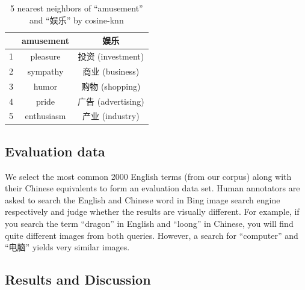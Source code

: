 \begin{table}
\small
\centering
\begin{tabular}{|c|c|c|}
\hline
 & \bf{amusement} & \bf{娱乐} \\ \hline
\hline
1 & pleasure & 投资 (investment) \\
\hline
2 & sympathy & 商业 (business)\\
\hline
3 &  humor & 购物 (shopping)\\
\hline
4 &  pride &  广告 (advertising)\\
\hline
5 &  enthusiasm &  产业 (industry)\\

\hline
\end{tabular}
\caption{5 nearest neighbors of ``amusement'' and ``娱乐'' by cosine-knn}
\label{tab:nn}
\end{table}

\subsection{Evaluation data}

We select the most common 2000 English terms (from our corpus)
along with their Chinese equivalents to form an evaluation data set. 
Human annotators are 
asked to search the English and Chinese word in Bing image 
search engine respectively and judge whether the results are visually
different.  For example, if you search the term ``dragon'' in English 
and ``loong'' in Chinese, you will find quite different images from
both queries. However, a search for ``computer'' and ``电脑'' yields
very similar images. 

\subsection{Results and Discussion}

